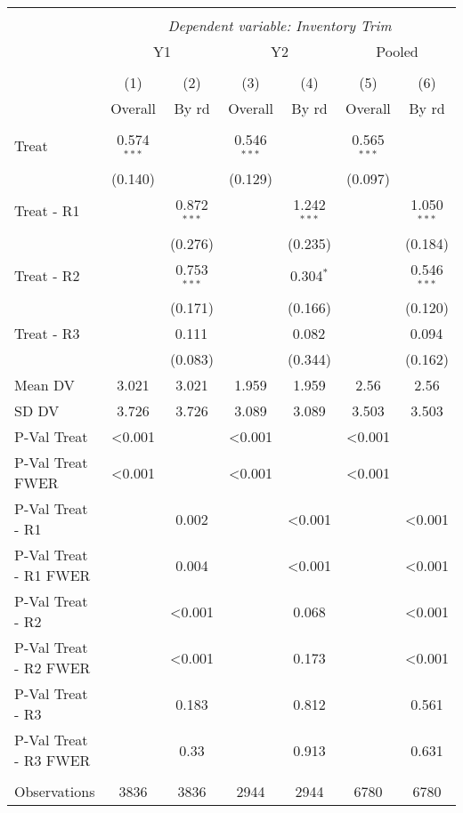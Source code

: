 \begin{tabular}{@{\extracolsep{5pt}}lcccccc}
\\[-1.8ex]\hline
\hline \\[-1.8ex]
& \multicolumn{6}{c}{\textit{Dependent variable: Inventory Trim}} \
\cr \cline{2-7}
\\[-1.8ex] & \multicolumn{2}{c}{Y1} & \multicolumn{2}{c}{Y2} & \multicolumn{2}{c}{Pooled}  \\
\\[-1.8ex] & (1) & (2) & (3) & (4) & (5) & (6) 
 \\ & Overall & By rd & Overall & By rd & Overall & By rd \\
\hline \\[-1.8ex]
 Treat & 0.574$^{***}$ & & 0.546$^{***}$ & & 0.565$^{***}$ & \\
& (0.140) & & (0.129) & & (0.097) & \\
 Treat - R1 & & 0.872$^{***}$ & & 1.242$^{***}$ & & 1.050$^{***}$ \\
& & (0.276) & & (0.235) & & (0.184) \\
 Treat - R2 & & 0.753$^{***}$ & & 0.304$^{*}$ & & 0.546$^{***}$ \\
& & (0.171) & & (0.166) & & (0.120) \\
 Treat - R3 & & 0.111$^{}$ & & 0.082$^{}$ & & 0.094$^{}$ \\
& & (0.083) & & (0.344) & & (0.162) \\
 Mean DV & 3.021 & 3.021 & 1.959 & 1.959 & 2.56 & 2.56 \\
 SD DV & 3.726 & 3.726 & 3.089 & 3.089 & 3.503 & 3.503 \\
 P-Val Treat & <0.001 &  & <0.001 &  & <0.001 &  \\
 P-Val Treat FWER & <0.001 &  & <0.001 &  & <0.001 &  \\
 P-Val Treat - R1 &  & 0.002 &  & <0.001 &  & <0.001 \\
 P-Val Treat - R1 FWER &  & 0.004 &  & <0.001 &  & <0.001 \\
 P-Val Treat - R2 &  & <0.001 &  & 0.068 &  & <0.001 \\
 P-Val Treat - R2 FWER &  & <0.001 &  & 0.173 &  & <0.001 \\
 P-Val Treat - R3 &  & 0.183 &  & 0.812 &  & 0.561 \\
 P-Val Treat - R3 FWER &  & 0.33 &  & 0.913 &  & 0.631 \\
\hline \\[-1.8ex]
 Observations & 3836 & 3836 & 2944 & 2944 & 6780 & 6780 \\

\end{tabular}
